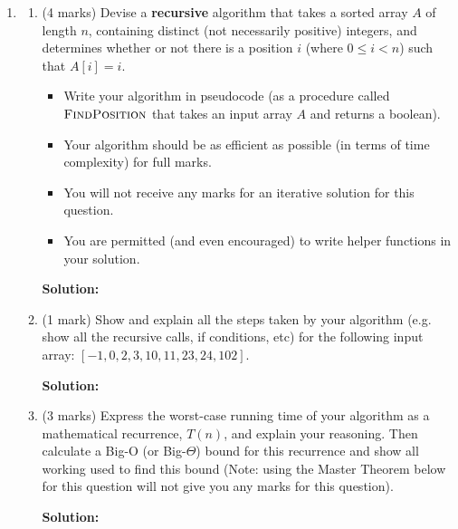 \documentclass[a4,13pt]{extarticle}
\newenvironment{Solution}{\color{blue}\textbf{Solution:}}{}
\begin{document}
\begin{enumerate}
	\item 
	      \begin{enumerate}
	      	\item (4 marks) Devise a \textbf{recursive} algorithm that takes a sorted array $A$ of length $n$, containing distinct (not necessarily positive) integers, and determines whether or not there is a position $i$ (where $0\leq i < n$) such that $A[i] = i$.
	      	      \begin{itemize}
	      	      	\item Write your algorithm in pseudocode (as a procedure called $\textsc{FindPosition}$ that takes an input array $A$ and returns a boolean).
	      	      	\item Your algorithm should be as efficient as possible (in terms of time complexity) for full marks.
	      	      	\item You will not receive any marks for an iterative solution for this question. 
	      	      	\item You are permitted (and even encouraged) to write helper functions in your solution.
	      	      \end{itemize}
	      	      
	      	\begin{Solution}
	      	\end{Solution}
	      	
	      	\item (1 mark) Show and explain all the steps taken by your algorithm (e.g. show all the recursive calls, if conditions, etc) for the following input array: $[-1,0,2,3,10,11,23,24,102]$.
	      	
	      	\begin{Solution}
	      	\end{Solution}
	      	      	      	                  
	      	\item (3 marks) Express the worst-case running time of your algorithm as a mathematical recurrence, $T(n)$, and explain your reasoning. 
	      	      Then calculate a Big-O (or Big-$\Theta$) bound for this recurrence and show all working used to find this bound 
	      	      (Note: using the Master Theorem below for this question will not give you any marks for this question).
	      	      
	      	      
	        \begin{Solution}
	      	\end{Solution}
	      	

\end{enumerate}
\end{enumerate}
\end{document}
